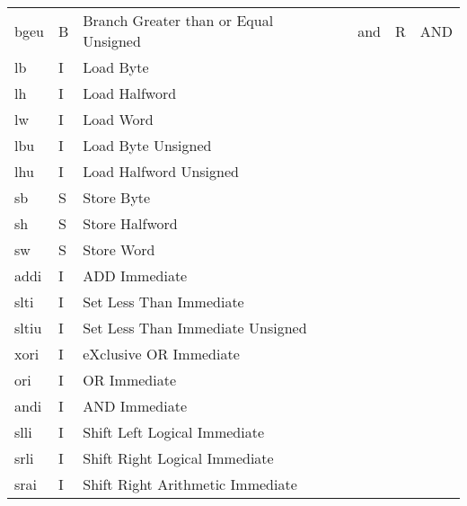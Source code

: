 \documentclass[./specs.tex]{subfiles}
\begin{document}
\begin{table*}[h]
\begin{tabular}{|l|l|l|llll}
    bgeu  & B    & Branch Greater than or Equal Unsigned   & \multicolumn{1}{l|}{} & \multicolumn{1}{l|}{and}    & \multicolumn{1}{l|}{R}    & \multicolumn{1}{l|}{AND}                          \\ \cline{5-7}
    lb    & I    & Load Byte                               & & & & \\
    lh    & I    & Load Halfword                           & & & & \\
    lw    & I    & Load Word                               & & & & \\
    lbu   & I    & Load Byte Unsigned                      & & & & \\
    lhu   & I    & Load Halfword Unsigned                  & & & & \\
    sb    & S    & Store Byte                              & & & & \\
    sh    & S    & Store Halfword                          & & & & \\
    sw    & S    & Store Word                              & & & & \\ 
    addi  & I    & ADD Immediate                           & & & & \\
    slti  & I    & Set Less Than Immediate                 & & & & \\
    sltiu & I    & Set Less Than Immediate Unsigned        & & & & \\
    xori  & I    & eXclusive OR Immediate                  & & & & \\
    ori   & I    & OR Immediate                            & & & & \\
    andi  & I    & AND Immediate                           & & & & \\
    slli  & I    & Shift Left Logical Immediate            & & & & \\
    srli  & I    & Shift Right Logical Immediate           & & & & \\
    srai  & I    & Shift Right Arithmetic Immediate        & & & & \\ \cline{1-3}
    \end{tabular}
  \end{table*}
\end{document}
